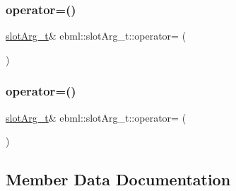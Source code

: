 \mbox{\label{classebml_1_1slotArg__t_a54036af9209665fea3f02b8c2822aea5}} 
\subsubsection{\texorpdfstring{operator=()}{operator=()}\hspace{0.1cm}{\footnotesize\ttfamily [5/6]}}
{\footnotesize\ttfamily \mbox{\hyperlink{classebml_1_1slotArg__t}{slot\+Arg\+\_\+t}}\& ebml\+::slot\+Arg\+\_\+t\+::operator= (\begin{DoxyParamCaption}\item[{const \mbox{\hyperlink{namespaceebml_a1ddadd26791f273d851882653b9caf70}{ebml\+Element\+\_\+l}} \&}]{ }\end{DoxyParamCaption})}

\mbox{\label{classebml_1_1slotArg__t_ae7d90c0e339c51fc5c5422453dcc3d9b}} 
\subsubsection{\texorpdfstring{operator=()}{operator=()}\hspace{0.1cm}{\footnotesize\ttfamily [6/6]}}
{\footnotesize\ttfamily \mbox{\hyperlink{classebml_1_1slotArg__t}{slot\+Arg\+\_\+t}}\& ebml\+::slot\+Arg\+\_\+t\+::operator= (\begin{DoxyParamCaption}\item[{\mbox{\hyperlink{namespaceebml_a1ddadd26791f273d851882653b9caf70}{ebml\+Element\+\_\+l}} \&\&}]{ }\end{DoxyParamCaption})}



\subsection{Member Data Documentation}
\mbox{\label{classebml_1_1slotArg__t_a325527b79851e58d33d7b9bbc1a28a67}} 
